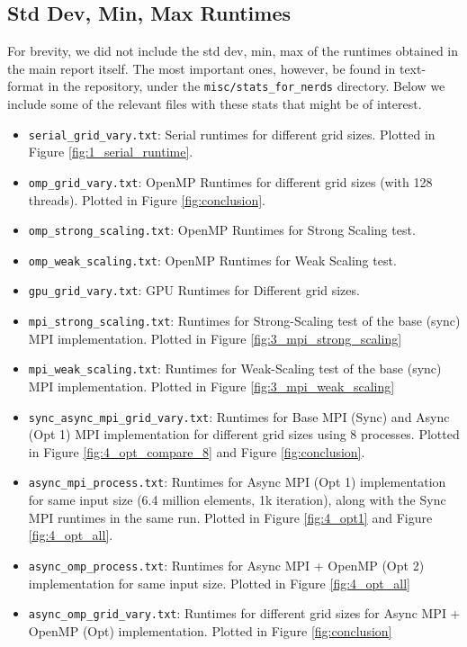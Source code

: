 \documentclass[a4paper,10pt]{article}
\begin{document}
\subsection{Std Dev, Min, Max Runtimes}
For brevity, we did not include the std dev, min, max of the runtimes obtained in the main report itself. The most important ones, however, be found in text-format in the repository, under the \verb|misc/stats_for_nerds| directory. Below we include some of the relevant files with these stats that might be of interest.
\begin{itemize}
\item \verb|serial_grid_vary.txt|: Serial runtimes for different grid sizes. Plotted in Figure \ref{fig:1_serial_runtime}.
\item \verb|omp_grid_vary.txt|: OpenMP Runtimes for different grid sizes (with 128 threads). Plotted in Figure \ref{fig:conclusion}.
\item \verb|omp_strong_scaling.txt|: OpenMP Runtimes for Strong Scaling test.
\item \verb|omp_weak_scaling.txt|: OpenMP Runtimes for Weak Scaling test.
\item \verb|gpu_grid_vary.txt|: GPU Runtimes for Different grid sizes.
\item \verb|mpi_strong_scaling.txt|: Runtimes for Strong-Scaling test of the base (sync) MPI implementation. Plotted in Figure \ref{fig:3_mpi_strong_scaling}
\item \verb|mpi_weak_scaling.txt|: Runtimes for Weak-Scaling test of the base (sync) MPI implementation. Plotted in Figure \ref{fig:3_mpi_weak_scaling}
\item \verb|sync_async_mpi_grid_vary.txt|: Runtimes for Base MPI (Sync) and Async (Opt 1) MPI implementation for different grid sizes using 8 processes. Plotted in Figure \ref{fig:4_opt_compare_8} and Figure \ref{fig:conclusion}.
\item \verb|async_mpi_process.txt|: Runtimes for Async MPI (Opt 1) implementation for same input size (6.4 million elements, 1k iteration), along with the Sync MPI runtimes in the same run. Plotted in Figure \ref{fig:4_opt1} and Figure \ref{fig:4_opt_all}.
\item \verb|async_omp_process.txt|: Runtimes for Async MPI + OpenMP (Opt 2) implementation for same input size. Plotted in Figure \ref{fig:4_opt_all}
\item \verb|async_omp_grid_vary.txt|: Runtimes for different grid sizes for Async MPI + OpenMP (Opt) implementation. Plotted in Figure \ref{fig:conclusion}
\end{itemize}


\end{document}
